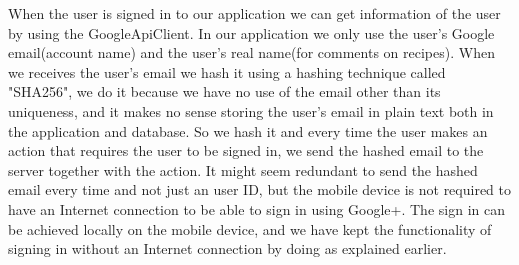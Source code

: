 When the user is signed in to our application we can get information of the user by using the GoogleApiClient.
In our application we only use the user's Google email(account name) and the user's real name(for comments on recipes). 
When we receives the user's email we hash it using a hashing technique called "SHA256", we do it because we have no use of the email other than its uniqueness, and it makes no sense storing the user's email in plain text both in the application and database. 
So we hash it and every time the user makes an action that requires the user to be signed in, we send the hashed email to the server together with the action. 
It might seem redundant to send the hashed email every time and not just an user ID, but the mobile device is not required to have an Internet connection to be able to sign in using Google+. 
The sign in can be achieved locally on the mobile device, and we have kept the functionality of signing in without an Internet connection by doing as explained earlier.



